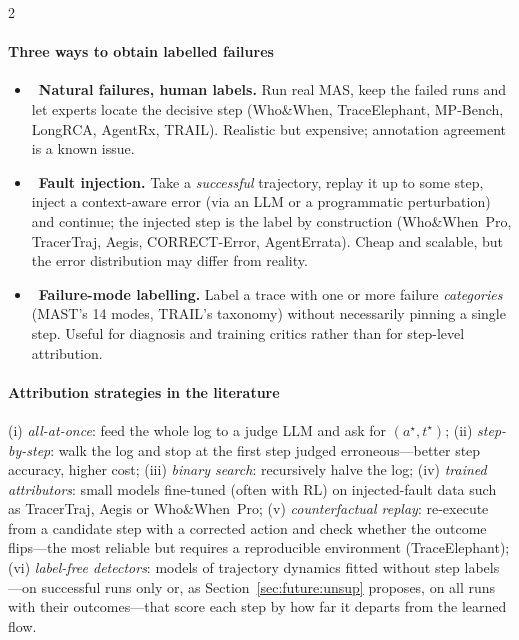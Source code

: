 \begin{multicols}{2}
\paragraph{Three ways to obtain labelled failures}
\begin{itemize}[leftmargin=1.1em]
\item \naturalbadge\ \textbf{Natural failures, human labels.} Run real MAS, keep the failed runs and let experts locate the decisive step (Who\&When, TraceElephant, MP-Bench, LongRCA, AgentRx, TRAIL). Realistic but expensive; annotation agreement is a known issue.
\item \injected\ \textbf{Fault injection.} Take a \emph{successful} trajectory, replay it up to some step, inject a context-aware error (via an LLM or a programmatic perturbation) and continue; the injected step is the label by construction (Who\&When~Pro, TracerTraj, Aegis, CORRECT-Error, AgentErrata). Cheap and scalable, but the error distribution may differ from reality.
\item {}\ \textbf{Failure-mode labelling.} Label a trace with one or more failure \emph{categories} (MAST's 14 modes, TRAIL's taxonomy) without necessarily pinning a single step. Useful for diagnosis and training critics rather than for step-level attribution.
\end{itemize}

\paragraph{Attribution strategies in the literature} (i) \emph{all-at-once}: feed the whole log to a judge LLM and ask for $(a^\star,t^\star)$; (ii) \emph{step-by-step}: walk the log and stop at the first step judged erroneous---better step accuracy, higher cost; (iii) \emph{binary search}: recursively halve the log; (iv) \emph{trained attributors}: small models fine-tuned (often with RL) on injected-fault data such as TracerTraj, Aegis or Who\&When~Pro; (v) \emph{counterfactual replay}: re-execute from a candidate step with a corrected action and check whether the outcome flips---the most reliable but requires a reproducible environment (TraceElephant); (vi) \emph{label-free detectors}: models of trajectory dynamics fitted without step labels---on successful runs only \cite{yeh2026oat} or, as Section~\ref{sec:future:unsup} proposes, on all runs with their outcomes---that score each step by how far it departs from the learned flow.
\end{multicols}
